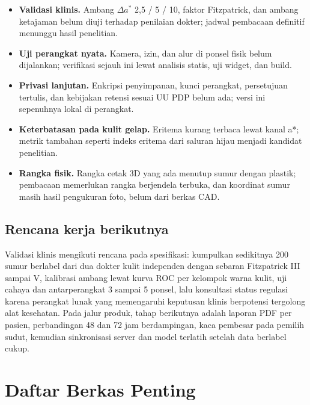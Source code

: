 \documentclass[11pt,a4paper]{article}
\begin{document}
\begin{itemize}
\item \textbf{Validasi klinis.} Ambang $\Delta a^*$ 2,5 / 5 / 10, faktor
Fitzpatrick, dan ambang ketajaman belum diuji terhadap penilaian dokter;
jadwal pembacaan definitif menunggu hasil penelitian.
\item \textbf{Uji perangkat nyata.} Kamera, izin, dan alur di ponsel fisik belum
dijalankan; verifikasi sejauh ini lewat analisis statis, uji widget, dan build.
\item \textbf{Privasi lanjutan.} Enkripsi penyimpanan, kunci perangkat,
persetujuan tertulis, dan kebijakan retensi sesuai UU PDP belum ada; versi ini
sepenuhnya lokal di perangkat.
\item \textbf{Keterbatasan pada kulit gelap.} Eritema kurang terbaca lewat
kanal a*; metrik tambahan seperti indeks eritema dari saluran hijau menjadi
kandidat penelitian.
\item \textbf{Rangka fisik.} Rangka cetak 3D yang ada menutup sumur dengan
plastik; pembacaan memerlukan rangka berjendela terbuka, dan koordinat sumur
masih hasil pengukuran foto, belum dari berkas CAD.
\end{itemize}

\subsection{Rencana kerja berikutnya}

Validasi klinis mengikuti rencana pada spesifikasi: kumpulkan sedikitnya 200
sumur berlabel dari dua dokter kulit independen dengan sebaran Fitzpatrick III
sampai V, kalibrasi ambang lewat kurva ROC per kelompok warna kulit, uji cahaya
dan antarperangkat 3 sampai 5 ponsel, lalu konsultasi status regulasi karena
perangkat lunak yang memengaruhi keputusan klinis berpotensi tergolong alat
kesehatan. Pada jalur produk, tahap berikutnya adalah laporan PDF per pasien,
perbandingan 48 dan 72 jam berdampingan, kaca pembesar pada pemilih sudut,
kemudian sinkronisasi server dan model terlatih setelah data berlabel cukup.

\appendix
\section{Daftar Berkas Penting}
\end{document}
